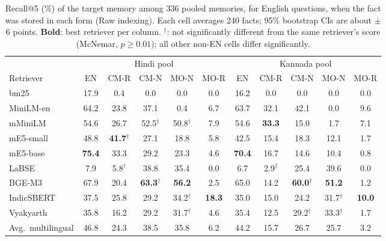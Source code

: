 \begin{table}[t]
\centering
\small
\setlength{\tabcolsep}{4pt}
\caption{Recall@5 (\%) of the target memory among 336 pooled memories, for English questions, when the fact was stored in each form (Raw indexing). Each cell averages 240 facts; 95\% bootstrap CIs are about $\pm$6 points. \textbf{Bold}: best retriever per column. $^\dagger$: not significantly different from the same retriever's  score (McNemar, $p\ge 0.01$); all other non-EN cells differ significantly.}
\label{tab:main}
\begin{tabular}{@{}l ccccc ccccc@{}}
\toprule
 & \multicolumn{5}{c}{Hindi pool} & \multicolumn{5}{c}{Kannada pool} \\
\cmidrule(lr){2-6}\cmidrule(lr){7-11}
Retriever & EN & CM-R & CM-N & MO-N & MO-R & EN & CM-R & CM-N & MO-N & MO-R \\
\midrule
bm25 & 17.9 & 0.4 & 0.0 & 0.0 & 0.0 & 16.2 & 0.0 & 0.0 & 0.0 & 0.0 \\
MiniLM-en & 64.2 & 23.8 & 37.1 & 0.4 & 6.7 & 63.7 & 32.1 & 42.1 & 0.0 & 9.6 \\
\midrule
mMiniLM & 54.6 & 26.7 & 52.5$^\dagger$ & 50.8$^\dagger$ & 7.9 & 54.6 & \textbf{33.3} & 15.0 & 1.7 & 7.1 \\
mE5-small & 48.8 & \textbf{41.7}$^\dagger$ & 27.1 & 18.8 & 5.8 & 42.5 & 15.4 & 18.3 & 12.1 & 1.7 \\
mE5-base & \textbf{75.4} & 33.3 & 29.2 & 23.3 & 4.6 & \textbf{70.4} & 16.7 & 14.6 & 10.4 & 0.8 \\
LaBSE & 7.9 & 5.8$^\dagger$ & 38.8 & 35.4 & 0.0 & 6.7 & 2.9$^\dagger$ & 25.4 & 39.6 & 0.0 \\
BGE-M3 & 67.9 & 20.4 & \textbf{63.3}$^\dagger$ & \textbf{56.2} & 2.5 & 65.0 & 14.2 & \textbf{60.0}$^\dagger$ & \textbf{51.2} & 1.2 \\
\midrule
IndicSBERT & 37.5 & 25.8 & 29.2 & 34.2$^\dagger$ & \textbf{18.3} & 35.0 & 15.0 & 24.2 & 31.7$^\dagger$ & \textbf{10.0} \\
Vyakyarth & 35.8 & 16.2 & 29.2 & 31.7$^\dagger$ & 4.6 & 35.4 & 12.5 & 29.2$^\dagger$ & 33.3$^\dagger$ & 1.7 \\
\midrule
Avg.\ multilingual & 46.8 & 24.3 & 38.5 & 35.8 & 6.2 & 44.2 & 15.7 & 26.7 & 25.7 & 3.2 \\
\bottomrule
\end{tabular}
\end{table}
